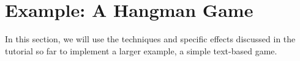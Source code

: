 \section{Example: A Hangman Game}

In this section, we will use the techniques and specific effects discussed
in the tutorial so far to implement a larger example, a simple text-based
game.
